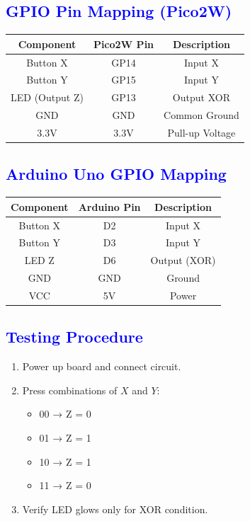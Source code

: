 \documentclass[twocolumn]{article}
\begin{document}
\subsection*{\textcolor{blue}{GPIO Pin Mapping (Pico2W)}}

\begin{table}[h]
\centering
\renewcommand{\arraystretch}{1.3}
\begin{tabular}{|c|c|c|}
\hline
\textbf{Component} & \textbf{Pico2W Pin} & \textbf{Description} \\
\hline
Button X & GP14 & Input X \\
Button Y & GP15 & Input Y \\
LED (Output Z) & GP13 & Output XOR \\
GND & GND & Common Ground \\
3.3V & 3.3V & Pull-up Voltage \\
\hline
\end{tabular}
\end{table}

\subsection*{\textcolor{blue}{Arduino Uno GPIO Mapping}}

\begin{table}[h]
\centering
\renewcommand{\arraystretch}{1.3}
\begin{tabular}{|c|c|c|}
\hline
\textbf{Component} & \textbf{Arduino Pin} & \textbf{Description} \\
\hline
Button X & D2 & Input X \\
Button Y & D3 & Input Y \\
LED Z & D6 & Output (XOR) \\
GND & GND & Ground \\
VCC & 5V & Power \\
\hline
\end{tabular}
\end{table}

\subsection*{\textcolor{blue}{Testing Procedure}}
\begin{enumerate}
    \item Power up board and connect circuit.
    \item Press combinations of $X$ and $Y$:
    \begin{itemize}
        \item 00 → Z = 0
        \item 01 → Z = 1
        \item 10 → Z = 1
        \item 11 → Z = 0
    \end{itemize}
    \item Verify LED glows only for XOR condition.
\end{enumerate}
\end{document}
